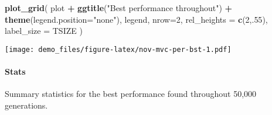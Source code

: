 \documentclass[]{book}
\newenvironment{Shaded}{\begin{snugshade}}{\end{snugshade}}
\newcommand{\DataTypeTok}[1]{\textcolor[rgb]{0.13,0.29,0.53}{#1}}
\newcommand{\DecValTok}[1]{\textcolor[rgb]{0.00,0.00,0.81}{#1}}
\newcommand{\KeywordTok}[1]{\textcolor[rgb]{0.13,0.29,0.53}{\textbf{#1}}}
\newcommand{\NormalTok}[1]{#1}
\newcommand{\OperatorTok}[1]{\textcolor[rgb]{0.81,0.36,0.00}{\textbf{#1}}}
\newcommand{\OtherTok}[1]{\textcolor[rgb]{0.56,0.35,0.01}{#1}}
\newcommand{\StringTok}[1]{\textcolor[rgb]{0.31,0.60,0.02}{#1}}
\let\oldparagraph\paragraph
\renewcommand{\paragraph}[1]{\oldparagraph{#1}\mbox{}}
\begin{document}
\begin{Shaded}
\begin{Highlighting}[]
\KeywordTok{plot_grid}\NormalTok{(}
\NormalTok{  plot }\OperatorTok{+}
\StringTok{    }\KeywordTok{ggtitle}\NormalTok{(}\StringTok{"Best performance throughout"}\NormalTok{) }\OperatorTok{+}
\StringTok{    }\KeywordTok{theme}\NormalTok{(}\DataTypeTok{legend.position=}\StringTok{"none"}\NormalTok{),}
\NormalTok{  legend,}
  \DataTypeTok{nrow=}\DecValTok{2}\NormalTok{,}
  \DataTypeTok{rel_heights =} \KeywordTok{c}\NormalTok{(}\DecValTok{2}\NormalTok{,.}\DecValTok{55}\NormalTok{),}
  \DataTypeTok{label_size =}\NormalTok{ TSIZE}
\NormalTok{)}
\end{Highlighting}
\end{Shaded}

\texttt{[image: demo\_files/figure-latex/nov-mvc-per-bst-1.pdf]}

\hypertarget{stats-85}{%
\paragraph{Stats}\label{stats-85}}

Summary statistics for the best performance found throughout 50,000 generations.

\begin{Shaded}
\end{Shaded}
\end{document}

